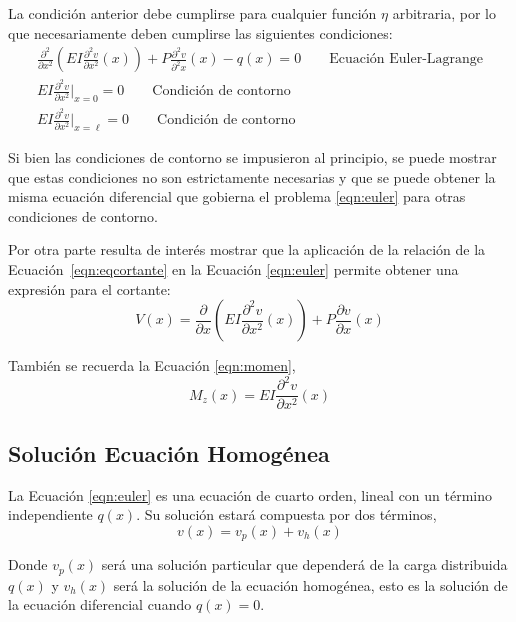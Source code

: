 La condición anterior debe cumplirse para cualquier función $\eta$ arbitraria, por lo que necesariamente deben cumplirse las siguientes condiciones:
%
\begin{eqnarray}
\frac{\partial^2}{\partial x^2} \left( EI \frac{\partial^2 v}{\partial x^2}(x) \right) + P \frac{\partial^2 v}{\partial^2 x}(x) - q(x) = 0 \qquad \text{Ecuación Euler-Lagrange} \label{eqn:euler} \\
EI\frac{\partial^2 v}{\partial x^2}\Bigg|_{x=0}=0 \qquad \text{Condición de contorno} \label{eqn:contorno1} \\
EI\frac{\partial^2 v}{\partial x^2}\Bigg|_{x=\ell}=0 \qquad \text{Condición de contorno} \label{eqn:contorno2}
\end{eqnarray}

Si bien las condiciones de contorno se impusieron al principio, se puede mostrar que estas condiciones no son estrictamente necesarias y que se puede obtener la misma ecuación diferencial que gobierna el problema \eqref{eqn:euler} para otras condiciones de contorno.

Por otra parte resulta de interés mostrar que la aplicación de la relación de la Ecuación~\eqref{eqn:eqcortante} en la Ecuación \eqref{eqn:euler} permite obtener una expresión para el cortante:
%
\begin{equation}\label{eqn:condcortante}
V(x) =
\frac{\partial}{\partial x} \left( EI \frac{\partial^2 v}{\partial x^2}(x) \right) + P \frac{\partial v}{\partial x}(x)
\end{equation}

También se recuerda la Ecuación \eqref{eqn:momen},  
\begin{equation}\label{eqn:condmomento}
M_z (x) = E I \frac{\partial^2 v}{\partial x^2}(x)
\end{equation}

\subsection{Solución Ecuación Homogénea}

La Ecuación \eqref{eqn:euler} es una ecuación de cuarto orden, lineal con un término independiente $q(x)$. Su solución estará compuesta por dos términos,
\begin{equation}
v(x)= v_p(x) + v_h(x)
\end{equation}

Donde $v_p(x)$ será una solución particular que dependerá de la carga distribuida $q(x)$ y $v_h(x)$ será la solución de la ecuación homogénea, esto es la solución de la ecuación diferencial cuando $q(x)=0$.

